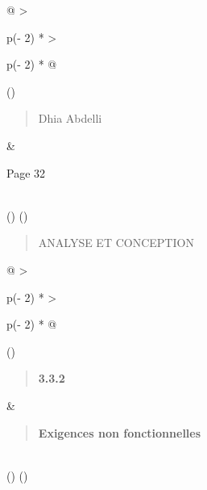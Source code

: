 \documentclass[
]{article}
\begin{document}
\begin{longtable}[]{@{}
  >{\raggedright\arraybackslash}p{(\columnwidth - 2\tabcolsep) * }
  >{\raggedright\arraybackslash}p{(\columnwidth - 2\tabcolsep) * }@{}}
\toprule()
\begin{minipage}[b]{\linewidth}\raggedright
\begin{quote}
Dhia Abdelli
\end{quote}
\end{minipage} & \begin{minipage}[b]{\linewidth}\raggedright
Page 32
\end{minipage} \\
\midrule()
\endhead
\bottomrule()
\end{longtable}

\begin{quote}
ANALYSE ET CONCEPTION
\end{quote}

\begin{longtable}[]{@{}
  >{\raggedright\arraybackslash}p{(\columnwidth - 2\tabcolsep) * }
  >{\raggedright\arraybackslash}p{(\columnwidth - 2\tabcolsep) * }@{}}
\toprule()
\begin{minipage}[b]{\linewidth}\raggedright
\begin{quote}
\textbf{3.3.2}
\end{quote}
\end{minipage} & \begin{minipage}[b]{\linewidth}\raggedright
\begin{quote}
\textbf{Exigences non fonctionnelles}
\end{quote}
\end{minipage} \\
\midrule()
\endhead
\bottomrule()
\end{longtable}
\end{document}
